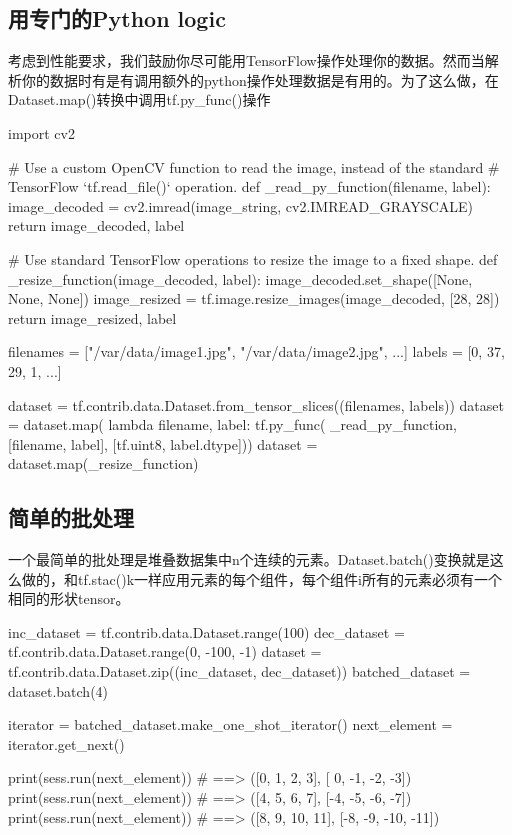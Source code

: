 \subsection{用专门的Python logic}
考虑到性能要求，我们鼓励你尽可能用TensorFlow操作处理你的数据。然而当解析你的数据时有是有调用额外的python操作处理数据是有用的。为了这么做，在Dataset.map()转换中调用tf.py\_func()操作
\begin{python}
import cv2

# Use a custom OpenCV function to read the image, instead of the standard
# TensorFlow `tf.read\_file()` operation.
def _read_py_function(filename, label):
  image_decoded = cv2.imread(image_string, cv2.IMREAD_GRAYSCALE)
  return image_decoded, label

# Use standard TensorFlow operations to resize the image to a fixed shape.
def _resize_function(image_decoded, label):
  image_decoded.set_shape([None, None, None])
  image_resized = tf.image.resize_images(image_decoded, [28, 28])
  return image_resized, label

filenames = ["/var/data/image1.jpg", "/var/data/image2.jpg", ...]
labels = [0, 37, 29, 1, ...]

dataset = tf.contrib.data.Dataset.from_tensor_slices((filenames, labels))
dataset = dataset.map(
    lambda filename, label: tf.py_func(
        _read_py_function, [filename, label], [tf.uint8, label.dtype]))
dataset = dataset.map(_resize_function)
\end{python}
\subsection{简单的批处理}
一个最简单的批处理是堆叠数据集中n个连续的元素。Dataset.batch()变换就是这么做的，和tf.stac()k一样应用元素的每个组件，每个组件i所有的元素必须有一个相同的形状tensor。
\begin{python}
inc_dataset = tf.contrib.data.Dataset.range(100)
dec_dataset = tf.contrib.data.Dataset.range(0, -100, -1)
dataset = tf.contrib.data.Dataset.zip((inc_dataset, dec_dataset))
batched_dataset = dataset.batch(4)

iterator = batched_dataset.make_one_shot_iterator()
next_element = iterator.get_next()

print(sess.run(next_element))  # ==> ([0, 1, 2,   3],   [ 0, -1,  -2,  -3])
print(sess.run(next_element))  # ==> ([4, 5, 6,   7],   [-4, -5,  -6,  -7])
print(sess.run(next_element))  # ==> ([8, 9, 10, 11],   [-8, -9, -10, -11])
\end{python}
